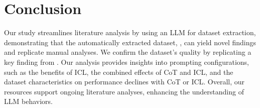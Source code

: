 \section{Conclusion}
\label{sec:conclusion}

Our study streamlines literature analysis by using an LLM for dataset extraction, demonstrating that the automatically extracted dataset, \datasetname, can yield novel findings and replicate manual analyses.
 We confirm the dataset's quality by replicating a key finding from \citet{sprague2024cot}. 
 Our analysis provides insights into prompting configurations, such as the benefits of ICL, the combined effects of CoT and ICL, and the dataset characteristics on performance declines with CoT or ICL.
 Overall, our resources support ongoing literature analyses, enhancing the understanding of LLM behaviors.